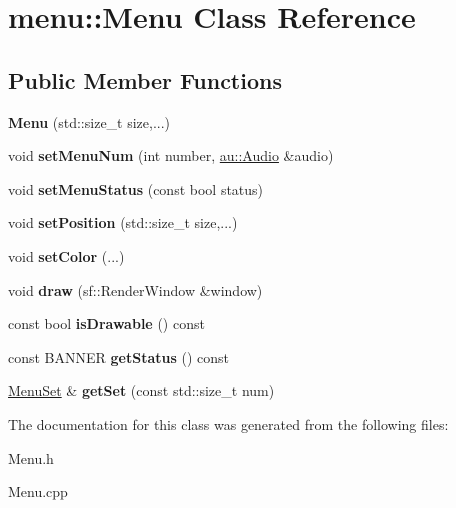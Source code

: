 \hypertarget{classmenu_1_1_menu}{}\section{menu\+:\+:Menu Class Reference}
\label{classmenu_1_1_menu}
\subsection*{Public Member Functions}
\begin{DoxyCompactItemize}
\item 
\mbox{\label{classmenu_1_1_menu_a471c1c981d516b2c921710b9d46b4d64}} 
{\bfseries Menu} (std\+::size\+\_\+t size,...)
\item 
\mbox{\label{classmenu_1_1_menu_a543eab53140ee366c47de0056836d98e}} 
void {\bfseries set\+Menu\+Num} (int number, \hyperlink{classau_1_1_audio}{au\+::\+Audio} \&audio)
\item 
\mbox{\label{classmenu_1_1_menu_a72d4d9a66df79b28dff856046290e7c8}} 
void {\bfseries set\+Menu\+Status} (const bool status)
\item 
\mbox{\label{classmenu_1_1_menu_a15c3d50dbe231b4ea742dbdd3798d182}} 
void {\bfseries set\+Position} (std\+::size\+\_\+t size,...)
\item 
\mbox{\label{classmenu_1_1_menu_af4f0954c9afaf67bde64f630705d7034}} 
void {\bfseries set\+Color} (...)
\item 
\mbox{\label{classmenu_1_1_menu_a944c3b2c03a066646ad9f34bc29fb7c1}} 
void {\bfseries draw} (sf\+::\+Render\+Window \&window)
\item 
\mbox{\label{classmenu_1_1_menu_a78bbc128a14245fdf727025fcd1a6aca}} 
const bool {\bfseries is\+Drawable} () const
\item 
\mbox{\label{classmenu_1_1_menu_ac9ecfcb61a15d56f8c3affbcb3398b42}} 
const B\+A\+N\+N\+ER {\bfseries get\+Status} () const
\item 
\mbox{\label{classmenu_1_1_menu_ad53be26e55cee886dd16aa0b5e0b80cd}} 
\hyperlink{classmenu_1_1_menu_set}{Menu\+Set} \& {\bfseries get\+Set} (const std\+::size\+\_\+t num)
\end{DoxyCompactItemize}


The documentation for this class was generated from the following files\+:\begin{DoxyCompactItemize}
\item 
Menu.\+h\item 
Menu.\+cpp\end{DoxyCompactItemize}

